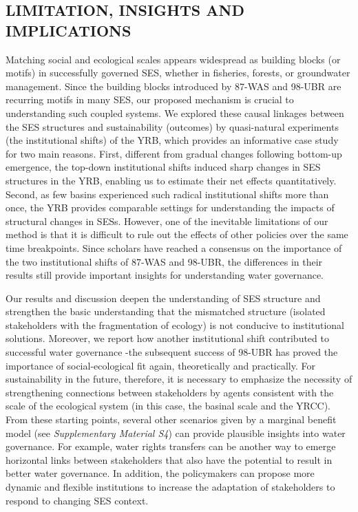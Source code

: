 \subsection{LIMITATION, INSIGHTS AND IMPLICATIONS}
\label{discussion-3}

Matching social and ecological scales appears widespread as building blocks (or motifs) in successfully governed SES, whether in fisheries, forests, or groundwater management.
Since the building blocks introduced by 87-WAS and 98-UBR are recurring motifs in many SES, our proposed mechanism is crucial to understanding such coupled systems.
We explored these causal linkages between the SES structures and sustainability (outcomes) by quasi-natural experiments (the institutional shifts) of the YRB, which provides an informative case study for two main reasons.
First, different from gradual changes following bottom-up emergence, the top-down institutional shifts induced sharp changes in SES structures in the YRB, enabling us to estimate their net effects quantitatively.
Second, as few basins experienced such radical institutional shifts more than once, the YRB provides comparable settings for understanding the impacts of structural changes in SESs.
However, one of the inevitable limitations of our method is that it is difficult to rule out the effects of other policies over the same time breakpoints.
Since scholars have reached a consensus on the importance of the two institutional shifts of 87-WAS and 98-UBR, the differences in their results still provide important insights for understanding water governance.

Our results and discussion deepen the understanding of SES structure and strengthen the basic understanding that the mismatched structure (isolated stakeholders with the fragmentation of ecology) is not conducive to institutional solutions.
Moreover, we report how another institutional shift contributed to successful water governance  -the subsequent success of 98-UBR has proved the importance of social-ecological fit again, theoretically and practically.
For sustainability in the future, therefore, it is necessary to emphasize the necessity of strengthening connections between stakeholders by agents consistent with the scale of the ecological system (in this case, the basinal scale and the YRCC).
From these starting points, several other scenarios given by a marginal benefit model (see \textit{Supplementary Material S4}) can provide plausible insights into water governance.
For example, water rights transfers can be another way to emerge horizontal links between stakeholders that also have the potential to result in better water governance.
In addition, the policymakers can propose more dynamic and flexible institutions to increase the adaptation of stakeholders to respond to changing SES context.

